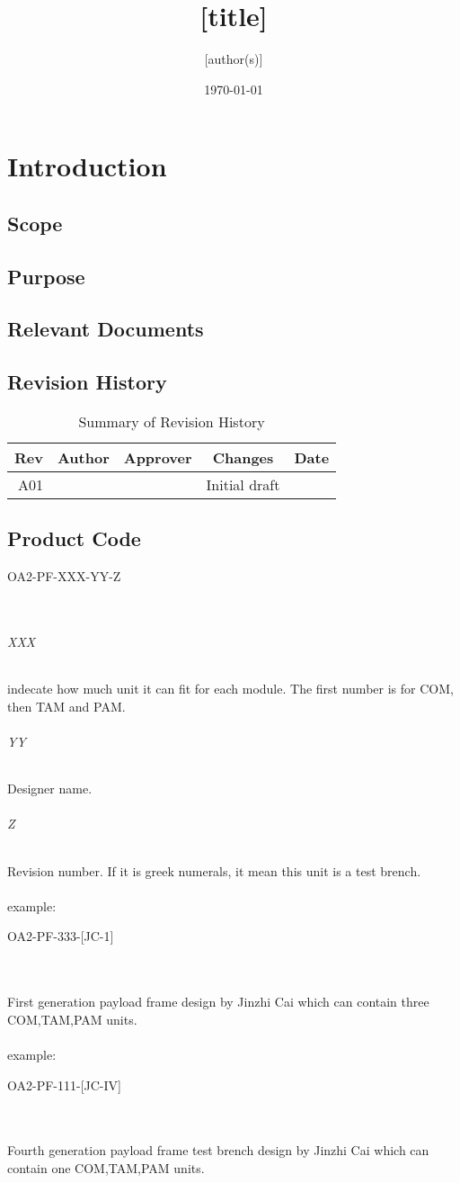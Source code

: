 \documentclass[12pt,article]{memoir}
\title{[title]}
\author{[author(s)]}
\date{\today}
\begin{document}
	


\tableofcontents*
\clearpage


\chapter{Introduction}
\section{Scope}

\section{Purpose}

\section{Relevant Documents}

\section{Revision History}
\begin{table}[H]
	\centering
	\begin{tabu}{r || c | c | c | c }
		Rev & Author & Approver & Changes & Date\\ \hline
		A01 & & & Initial draft & \\
	\end{tabu}
	\caption{Summary of Revision History}
	\label{tab:rev}
\end{table}

\section{Product Code}
\begin{LARGE}
OA2-PF-XXX-YY-Z
\end{LARGE}\\
\subparagraph{XXX}
indecate how much unit it can fit for each module. The first number is for COM, then TAM and PAM.
\subparagraph{YY}
Designer name.
\subparagraph{Z}
Revision number. If it is greek numerals, it mean this unit is a test brench.
\\\\
example: 
\begin{large}
OA2-PF-333-[JC-1]
\end{large}\\\\
First generation payload frame design by Jinzhi Cai which can contain three COM,TAM,PAM units.\\\\
example: 
\begin{large}
OA2-PF-111-[JC-IV]
\end{large}\\\\
Fourth generation payload frame test brench design by Jinzhi Cai which can contain one COM,TAM,PAM units.
\end{document}
